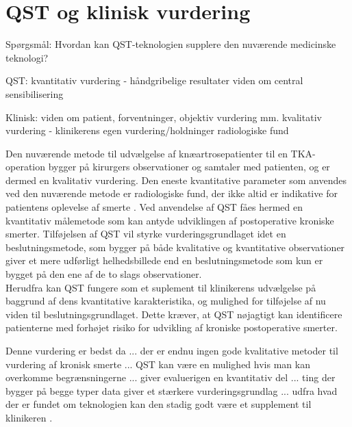 \section{QST og klinisk vurdering}

Spørgsmål:
Hvordan kan QST-teknologien supplere den nuværende medicinske teknologi?

QST:
kvantitativ vurdering - håndgribelige resultater 
viden om central sensibilisering

Klinisk:
viden om patient, forventninger, objektiv vurdering mm.
kvalitativ vurdering - klinikerens egen vurdering/holdninger
radiologiske fund


Den nuværende metode til udvælgelse af knæartrosepatienter til en TKA-operation bygger på kirurgers observationer og samtaler med patienten, og er dermed en kvalitativ vurdering. \citep{Troelsen2012} \citep{skou2016} Den eneste kvantitative parameter som anvendes ved den nuværende metode er radiologiske fund, der ikke altid er indikative for patientens oplevelse af smerte \citep{Leary2016}. Ved anvendelse af QST fåes hermed en kvantitativ målemetode som kan antyde udviklingen af postoperative kroniske smerter. Tilføjelsen af QST vil styrke vurderingsgrundlaget idet en beslutningsmetode, som bygger på både kvalitative og kvantitative observationer giver et mere udførligt helhedsbillede end en beslutningsmetode som kun er bygget på den ene af de to slags observationer. \citep{Gronmo2012} \\
Herudfra kan QST fungere som et suplement til klinikerens udvælgelse på baggrund af dens kvantitative karakteristika, og mulighed for tilføjelse af nu viden til beslutningsgrundlaget. Dette kræver, at QST nøjagtigt kan identificere patienterne med forhøjet risiko for udvikling af kroniske postoperative smerter.   




 


 

Denne vurdering er bedst da ... der er endnu ingen gode kvalitative metoder til vurdering af kronisk smerte ... QST kan være en mulighed hvis man kan overkomme begrænsningerne ... giver evaluerigen en kvantitativ del ... ting der bygger på begge typer data giver et stærkere vurderingsgrundlag ... udfra hvad der er fundet om teknologien kan den stadig godt være et supplement til klinikeren . 
